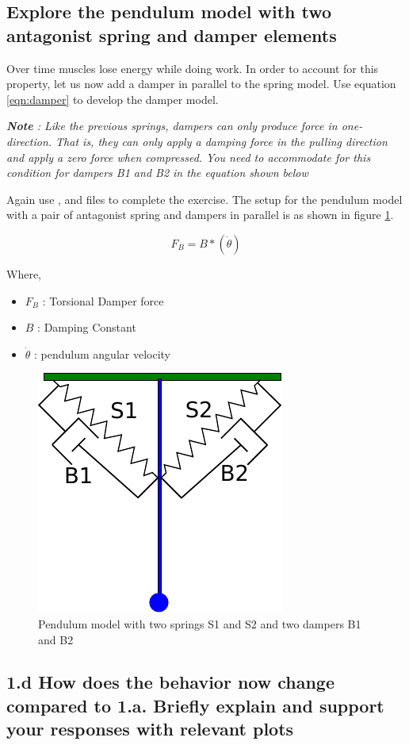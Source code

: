 \documentclass{cmc}
\begin{document}
\subsection*{Explore the pendulum model with two antagonist spring and damper elements}
Over time muscles lose energy while doing work. In order to account
for this property, let us now add a damper in parallel to the spring
model. Use equation \ref{eqn:damper} to develop the damper model.

\textit{\textbf{Note} : Like the previous springs, dampers can only
  produce force in one-direction.  That is, they can only apply a
  damping force in the pulling direction and apply a zero force when
  compressed. You need to accommodate for this condition for dampers B1
  and B2 in the equation shown below}

Again use ,  and
 files to complete the exercise. The
setup for the pendulum model with a pair of antagonist spring and
dampers in parallel is as shown in figure
\ref{fig:pendulum_spring_damper}.


\begin{equation}
  \label{eqn:damper}
  F_{B} = B*(\dot{\theta})
\end{equation}

Where,
\begin{itemize}
\item $F_{B}$ : Torsional Damper force
\item $B$ : Damping Constant
\item $\dot{\theta}$ : pendulum angular velocity
\end{itemize}


\begin{figure}[H]
  \centering
  \includegraphics[width=.3\textwidth]{figures/pendulum_spring_damper}
  \caption[pendulum with spring]{Pendulum model with two springs S1
    and S2 and two dampers B1 and B2}
  \label{fig:pendulum_spring_damper}
\end{figure}


\subsection*{1.d How does the behavior now change compared to
  1.a. Briefly explain and support your responses with relevant plots}
\end{document}
